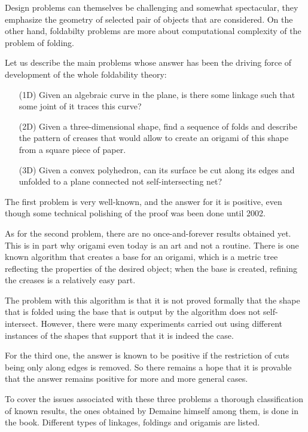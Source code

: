 \documentclass[a4paper,12pt]{article}
\begin{document}
Design problems can themselves be challenging and somewhat spectacular, they emphasize the geometry of selected pair of objects that are considered. On the other hand, foldabilty problems are more about computational complexity of the problem of folding.

Let us describe the main problems whose answer has been the driving force of development of the whole foldability theory: \begin{enumerate}
	\item[(1D)] Given an algebraic curve in the plane, is there some linkage such that some joint of it traces this curve?
	\item[(2D)] Given a three-dimensional shape, find a sequence of folds and describe the pattern of creases that would allow to create an origami of this shape from a square piece of paper.
	\item[(3D)] Given a convex polyhedron, can its surface be cut along its edges and unfolded to a plane connected not self-intersecting net?
\end{enumerate}

The first problem is very well-known, and the answer for it is positive, even though some technical polishing of the proof was been done until 2002.

As for the second problem, there are no once-and-forever results obtained yet. This is in part why origami even today is an art and not a routine. There is one known algorithm that creates a base for an origami, which is a metric tree reflecting the properties of the desired object; when the base is created, refining the creases is a relatively easy part.

The problem with this algorithm is that it is not proved formally that the shape that is folded using the base that is output by the algorithm does not self-intersect. However, there were many experiments carried out using different instances of the shapes that support that it is indeed the case.

For the third one, the answer is known to be positive if the restriction of cuts being only along edges is removed. So there remains a hope that it is provable that the answer remains positive for more and more general cases.

To cover the issues associated with these three problems a thorough classification of known results, the ones obtained by Demaine himself among them, is done in the book. Different types of linkages, foldings and origamis are listed.
\end{document}
